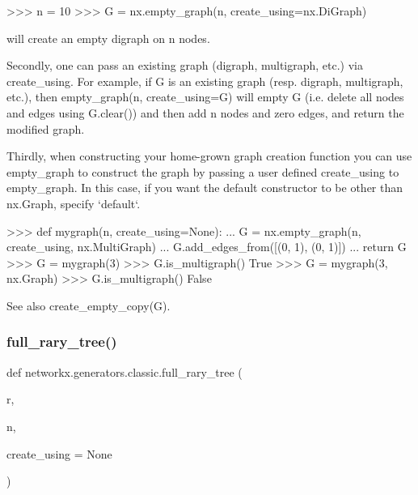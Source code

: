 \begin{DoxyVerb}
>>> n = 10
>>> G = nx.empty_graph(n, create_using=nx.DiGraph)

will create an empty digraph on n nodes.

Secondly, one can pass an existing graph (digraph, multigraph,
etc.) via create_using. For example, if G is an existing graph
(resp. digraph, multigraph, etc.), then empty_graph(n, create_using=G)
will empty G (i.e. delete all nodes and edges using G.clear())
and then add n nodes and zero edges, and return the modified graph.

Thirdly, when constructing your home-grown graph creation function
you can use empty_graph to construct the graph by passing a user
defined create_using to empty_graph. In this case, if you want the
default constructor to be other than nx.Graph, specify `default`.

>>> def mygraph(n, create_using=None):
...     G = nx.empty_graph(n, create_using, nx.MultiGraph)
...     G.add_edges_from([(0, 1), (0, 1)])
...     return G
>>> G = mygraph(3)
>>> G.is_multigraph()
True
>>> G = mygraph(3, nx.Graph)
>>> G.is_multigraph()
False

See also create_empty_copy(G).\end{DoxyVerb}
 \mbox{\label{namespacenetworkx_1_1generators_1_1classic_a69efb9b43871ae3c50d10a7103c2cc16}} 
\subsubsection{\texorpdfstring{full\+\_\+rary\+\_\+tree()}{full\_rary\_tree()}}
{\footnotesize\ttfamily def networkx.\+generators.\+classic.\+full\+\_\+rary\+\_\+tree (\begin{DoxyParamCaption}\item[{}]{r,  }\item[{}]{n,  }\item[{}]{create\+\_\+using = {\ttfamily None} }\end{DoxyParamCaption})}

